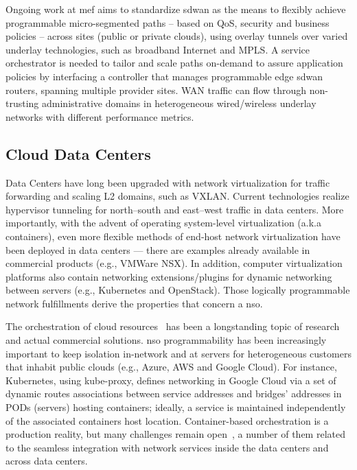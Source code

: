 Ongoing work at \gls{mef} aims to standardize \gls{sdwan} \cite{MEF:SDWAN:2017}  as the means to flexibly achieve programmable micro-segmented paths -- based on QoS, security and business policies -- across sites (public or private clouds), using overlay tunnels over varied underlay technologies, such as broadband Internet and MPLS. A service orchestrator is needed to tailor and scale paths on-demand to assure application policies by interfacing a controller that manages programmable edge \gls{sdwan} routers, spanning multiple provider sites. WAN traffic can flow through non-trusting administrative domains in heterogeneous wired/wireless underlay networks with different performance metrics.

\subsection{Cloud Data Centers}

Data Centers have long been upgraded with network virtualization for traffic forwarding and scaling L2 domains, such as VXLAN. Current technologies realize hypervisor tunneling for north--south and east--west traffic in data centers. More importantly, with the advent of operating system-level virtualization (a.k.a containers), even more flexible methods of end-host network virtualization have been deployed in data centers --- there are examples already available in commercial products (e.g., VMWare NSX). In addition, computer virtualization platforms also contain networking extensions/plugins for dynamic networking between servers (e.g., Kubernetes and OpenStack). Those logically programmable network fulfillments derive the properties that concern a \gls{nso}.

The orchestration of cloud resources~\cite{liu2011cloud} has been a longstanding topic of research and actual commercial solutions.  \gls{nso} programmability has been increasingly important to keep isolation in-network and at servers for heterogeneous customers that inhabit public clouds (e.g., Azure, AWS and Google Cloud). For instance, Kubernetes, using kube-proxy, defines networking in Google Cloud via a set of dynamic routes associations between service addresses and bridges' addresses in PODs (servers) hosting containers; ideally, a service is maintained independently of the associated containers host location. Container-based orchestration is a production reality, but many challenges remain open~\cite{7185168}, a number of them related to the seamless integration with network services inside the data centers and across data centers.

